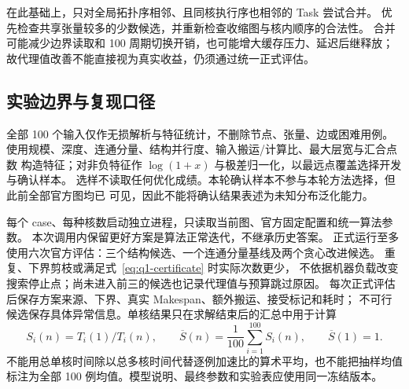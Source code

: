 在此基础上，只对全局拓扑序相邻、且同核执行序也相邻的 Task 尝试合并。
优先检查共享张量较多的少数候选，并重新检查收缩图与核内顺序的合法性。
合并可能减少边界读取和 100 周期切换开销，也可能增大缓存压力、延迟后继释放；
故代理值改善不能直接视为真实收益，仍须通过统一正式评估。

\subsection{实验边界与复现口径}
全部 100 个输入仅作无损解析与特征统计，不删除节点、张量、边或困难用例。
使用规模、深度、连通分量、结构并行度、输入搬运/计算比、最大层宽与汇合点数
构造特征；对非负特征作 $\log(1+x)$ 与极差归一化，以最远点覆盖选择开发与确认样本。
选样不读取任何优化成绩。本轮确认样本不参与本轮方法选择，但此前全部官方图均已
可见，因此不能将确认结果表述为未知分布泛化能力。

每个 case、每种核数启动独立进程，只读取当前图、官方固定配置和统一算法参数。
本次调用内保留更好方案是算法正常迭代，不继承历史答案。
正式运行至多使用六次官方评估：三个结构候选、一个连通分量基线及两个贪心改进候选。
重复、下界剪枝或满足式~\eqref{eq:q1-certificate} 时实际次数更少，
不依据机器负载改变搜索停止点；尚未进入前三的候选也记录代理值与预算跳过原因。
每次正式评估后保存方案来源、下界、真实 Makespan、额外搬运、接受标记和耗时；
不可行候选保存具体异常信息。单核结果只在求解结束后的汇总中用于计算
\begin{equation}
 S_i(n)=T_i(1)/T_i(n),\qquad
 \overline S(n)=\frac1{100}\sum_{i=1}^{100}S_i(n),\qquad \overline S(1)=1.
 \label{eq:q1-speedup}
\end{equation}
不能用总单核时间除以总多核时间代替逐例加速比的算术平均，也不能把抽样均值
标注为全部 100 例均值。模型说明、最终参数和实验表应使用同一冻结版本。
